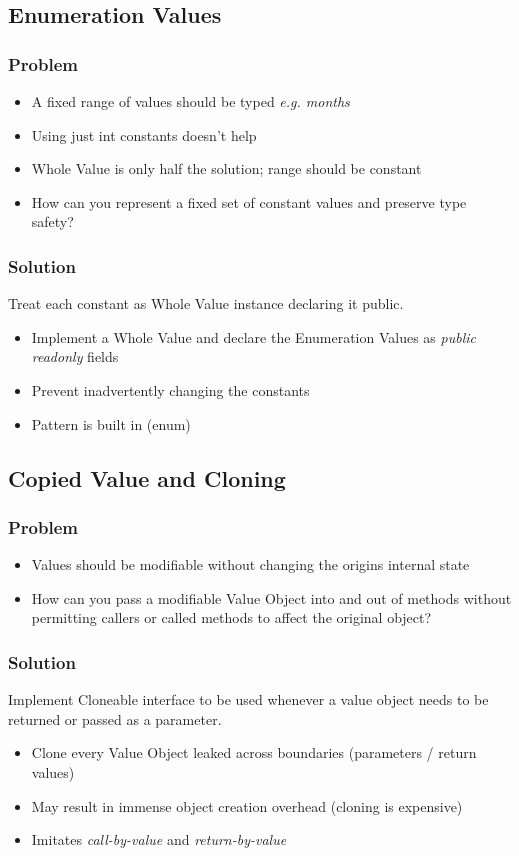 \subsection{Enumeration Values}
\subsubsection{Problem}
\begin{itemize}[topsep=0pt]
    \itemsep -0.4em
    \item A fixed range of values should be typed \textit{e.g. months}
    \item Using just int constants doesn't help
    \item Whole Value is only half the solution; range should be constant
    \item How can you represent a fixed set of constant values and preserve type safety?
\end{itemize}
\subsubsection{Solution}
Treat each constant as Whole Value instance declaring it public.
\begin{itemize}[topsep=0pt]
    \itemsep -0.4em
    \item Implement a Whole Value and declare the Enumeration Values as \textit{public readonly} fields
    \item Prevent inadvertently changing the constants
    \item Pattern is built in (enum)
\end{itemize}

\subsection{Copied Value and Cloning}
\subsubsection{Problem}
\begin{itemize}[topsep=0pt]
    \itemsep -0.4em
    \item Values should be modifiable without changing the origins internal state
    \item How can you pass a modifiable Value Object into and out of methods without permitting callers or called methods to affect the original object?
\end{itemize}
\subsubsection{Solution}
Implement Cloneable interface to be used whenever a value object needs to be returned or passed as a parameter.
\begin{itemize}[topsep=0pt]
    \itemsep -0.4em
    \item Clone every Value Object leaked across boundaries (parameters / return values)
    \item May result in immense object creation overhead (cloning is expensive)
    \item Imitates \textit{call-by-value} and \textit{return-by-value}
\end{itemize}

